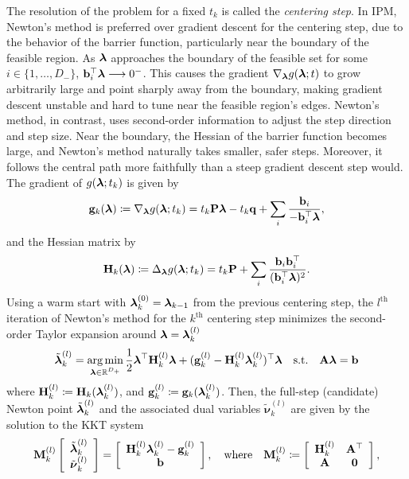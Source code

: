 The resolution of the problem for a fixed $t_k$ is called the \emph{centering step}. In IPM, Newton's method is preferred over gradient descent for the centering step, due to the behavior of the barrier function, particularly near the boundary of the feasible region. As $\boldsymbol{\lambda}$ approaches the boundary of the feasible set for some $i\in\{1,\ldots,D_-\}$, $\mathbf{b}_i^\top\boldsymbol{\lambda}\longrightarrow0^-$. This causes the gradient $\nabla_{\boldsymbol{\lambda}} g(\boldsymbol{\lambda};t)$ to grow arbitrarily large and point sharply away from the boundary, making gradient descent unstable and hard to tune near the feasible region's edges. Newton's method, in contrast, uses second-order information to adjust the step direction and step size. Near the boundary, the Hessian of the barrier function becomes large, and Newton's method naturally takes smaller, safer steps. Moreover, it follows the central path more faithfully than a steep gradient descent step would. The gradient of $g(\boldsymbol{\lambda};t_k)$ is given by
\begin{equation*}
	\mathbf{g}_k(\boldsymbol{\lambda})\coloneqq \nabla_{\boldsymbol{\lambda}} g(\boldsymbol{\lambda};t_k) = t_k\mathbf{P}\boldsymbol{\lambda} - t_k\mathbf{q} + \sum_i\frac{\mathbf{b}_i}{-\mathbf{b}_i^\top\boldsymbol{\lambda}},
\end{equation*}
and the Hessian matrix by
\begin{equation*}
	\mathbf{H}_k(\boldsymbol{\lambda})\coloneqq \Delta_{\boldsymbol{\lambda}} g(\boldsymbol{\lambda};t_k) = t_k\mathbf{P} + \sum_i\frac{\mathbf{b}_i\mathbf{b}_i^\top}{(\mathbf{b}_i^\top\boldsymbol{\lambda})^2}.
\end{equation*}
Using a warm start with $\boldsymbol{\lambda}_k^{(0)}=\boldsymbol{\lambda}_{k-1}$ from the previous centering step, the $l^\text{th}$ iteration of Newton's method for the $k^\text{th}$ centering step minimizes the second-order Taylor expansion around $\boldsymbol{\lambda}=\boldsymbol{\lambda}_k^{(l)}$
\begin{equation*}
	\tilde{\boldsymbol{\lambda}}_k^{(l)} = \operatorname*{arg\,min}_{\boldsymbol{\lambda}\in\mathbb{R}^{D_+}} \frac{1}{2}\boldsymbol{\lambda}^\top \mathbf{H}_k^{(l)}\boldsymbol{\lambda} + (\mathbf{g}_k^{(l)} - \mathbf{H}_k^{(l)}\boldsymbol{\lambda}_k^{(l)})^\top\boldsymbol{\lambda} \quad \text{s.t.}\quad \mathbf{A}\boldsymbol{\lambda} = \mathbf{b}
\end{equation*}
where $\mathbf{H}_k^{(l)}\coloneqq \mathbf{H}_k(\boldsymbol{\lambda}_k^{(l)})$, and $\mathbf{g}_k^{(l)}\coloneqq \mathbf{g}_k(\boldsymbol{\lambda}_k^{(l)})$. Then, the full-step (candidate) Newton point $\tilde{\boldsymbol{\lambda}}_k^{(l)}$ and the associated dual variables $\tilde{\boldsymbol{\nu}}_k^{(l)}$ are given by the solution to the KKT system
\begin{equation*}
	\mathbf{M}_k^{(l)}\left [
	\begin{array}{c}
		\tilde{\boldsymbol{\lambda}}_k^{(l)} \\
		\tilde{\boldsymbol{\nu}}_k^{(l)} 
	\end{array}
	\right ] = 
	\left [
	\begin{array}{c}
		\mathbf{H}_k^{(l)}\boldsymbol{\lambda}_k^{(l)} - \mathbf{g}_k^{(l)} \\
		\mathbf{b}
	\end{array}
	\right ],\quad\text{where}\quad
	\mathbf{M}_k^{(l)}\coloneqq\left [
	\begin{array}{cc}
		\mathbf{H}_k^{(l)} & \mathbf{A}^\top \\
		\mathbf{A} & \mathbf{0}  
	\end{array}
	\right ],
\end{equation*}
